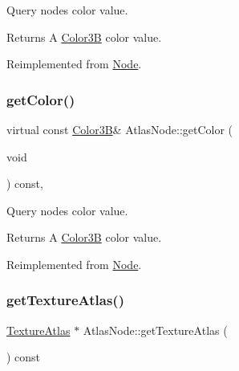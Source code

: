 Query node\textquotesingle{}s color value. \begin{DoxyReturn}{Returns}
A \hyperlink{structColor3B}{Color3B} color value. 
\end{DoxyReturn}


Reimplemented from \hyperlink{classNode_a06721d272f5a59e02e355d95be25bb99}{Node}.

\mbox{\label{classAtlasNode_a2921f746aab7922633bcd18790619e75}} 
\subsubsection{\texorpdfstring{get\+Color()}{getColor()}\hspace{0.1cm}{\footnotesize\ttfamily [2/2]}}
{\footnotesize\ttfamily virtual const \hyperlink{structColor3B}{Color3B}\& Atlas\+Node\+::get\+Color (\begin{DoxyParamCaption}\item[{void}]{ }\end{DoxyParamCaption}) const\hspace{0.3cm}{\ttfamily [override]}, {\ttfamily [virtual]}}

Query node\textquotesingle{}s color value. \begin{DoxyReturn}{Returns}
A \hyperlink{structColor3B}{Color3B} color value. 
\end{DoxyReturn}


Reimplemented from \hyperlink{classNode_a06721d272f5a59e02e355d95be25bb99}{Node}.

\mbox{\label{classAtlasNode_adce0f217e64e54bb095835acbea6174f}} 
\subsubsection{\texorpdfstring{get\+Texture\+Atlas()}{getTextureAtlas()}\hspace{0.1cm}{\footnotesize\ttfamily [1/2]}}
{\footnotesize\ttfamily \hyperlink{classTextureAtlas}{Texture\+Atlas} $\ast$ Atlas\+Node\+::get\+Texture\+Atlas (\begin{DoxyParamCaption}{ }\end{DoxyParamCaption}) const}

